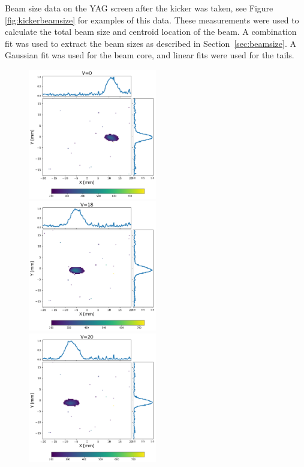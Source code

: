 Beam size data on the YAG screen after the kicker was taken, 
see Figure \ref{fig:kickerbeamsize} for examples of this data. 
These measurements were used to calculate the total beam size and 
centroid location of the beam. A combination fit was used to extract 
the beam sizes as described in Section~\ref{sec:beamsize}. 
A Gaussian fit was used for the beam core, and linear fits were used for the tails.
\begin{figure}
	\includegraphics[width=0.5\textwidth]{./images/yag6_kicker_voltage0}%
	\includegraphics[width=0.5\textwidth]{./images/yag6_kicker_voltage18}\\
	\includegraphics[width=0.5\textwidth]{./images/yag6_kicker_voltage20}%

\end{figure}
